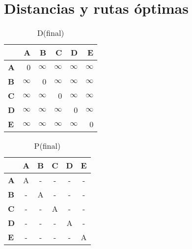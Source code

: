 \documentclass{article}
\newcommand{\INF}{$\infty$}
\begin{document}
\section*{Distancias y rutas óptimas}
\begin{table}[H]\centering
\caption{D(final)}
\begin{tabular}{l r r r r r}
\toprule
 & \textbf{A} & \textbf{B} & \textbf{C} & \textbf{D} & \textbf{E}\\\midrule
\textbf{A} & 0 & \INF & \INF & \INF & \INF \\
\textbf{B} & \INF & 0 & \INF & \INF & \INF \\
\textbf{C} & \INF & \INF & 0 & \INF & \INF \\
\textbf{D} & \INF & \INF & \INF & 0 & \INF \\
\textbf{E} & \INF & \INF & \INF & \INF & 0 \\
\bottomrule
\end{tabular}
\end{table}

\begin{table}[H]\centering
\caption{P(final)}
\begin{tabular}{l c c c c c}
\toprule
 & \textbf{A} & \textbf{B} & \textbf{C} & \textbf{D} & \textbf{E}\\\midrule
\textbf{A} & A & - & - & - & - \\
\textbf{B} & - & A & - & - & - \\
\textbf{C} & - & - & A & - & - \\
\textbf{D} & - & - & - & A & - \\
\textbf{E} & - & - & - & - & A \\
\bottomrule
\end{tabular}
\end{table}
\end{document}
